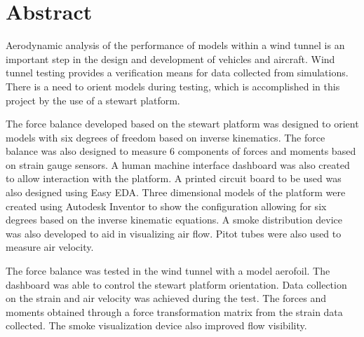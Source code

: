 
\section*{Abstract}
\label{sec:Abstract}
Aerodynamic analysis of the performance of models within a wind tunnel is an important step in the design and development of vehicles and aircraft. Wind tunnel testing provides a verification means for data collected from simulations. 
There is a need to orient models during testing, which is accomplished in this project by the use of a stewart platform.

The force balance developed based on the stewart platform was designed to orient models with six degrees of freedom based on inverse kinematics. 
The force balance was also designed to measure 6 components of forces and moments based on strain gauge sensors.  
A human machine interface dashboard was also created to allow interaction with the platform. A printed circuit board to be used was also designed using Easy EDA. Three dimensional models of the platform were created using Autodesk Inventor to show the configuration allowing for six degrees based on the inverse kinematic equations. 
A smoke distribution device was also developed to aid in visualizing air flow. Pitot tubes were also used to measure air velocity.

The force balance was tested in the wind tunnel with a model aerofoil. The dashboard was able to control the stewart platform orientation.
 Data collection on the strain and air velocity was achieved during the test. The forces and moments obtained through a force transformation matrix from the strain data collected. The smoke visualization device also improved flow visibility.


